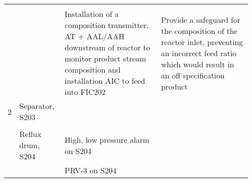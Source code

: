 \begin{table}[p]
\begin{tabularx}{\linewidth}{@{}lp{2cm}XX@{}}
     &                           &                                                                                                                                                               &                                                                                                                                                                                                                                                         \\ \cmidrule(l){3-4} 
     &                           & Installation of a composition transmitter, AT + AAL/AAH downstream of reactor to monitor product stream composition and installation AIC to feed into FIC202  & Provide a safeguard for the composition of the reactor inlet, preventing an incorrect feed ratio which would result in an off specification product                                                   \\ \midrule
2    & Separator, S203           &                                                                                                                                                               &                                                                                                                                                                                                                                                         \\ \cmidrule(l){3-4} 
     &                           &                                                                                                                                                               &                                                                                                                                                                                                                                                         \\ \cmidrule(l){2-4} 
     & Reflux drum, S204         & High, low pressure alarm on S204                                                                                                                              &                                                                                                                                                                                                                                                         \\ \cmidrule(l){3-4} 
     &                           & PRV-3 on S204                                                                                                                                                 &                                                                                                                                                                                                                                                         \\ \cmidrule(l){3-4} 

\end{tabularx}
\end{table}
